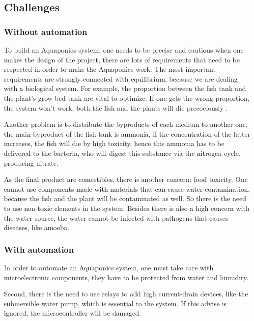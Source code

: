 \subsection{Challenges}

\subsubsection{Without automation}
To build an Aquaponics system,
one needs to be precise and cautious when one makes the design of the project,
there are lots of requirements that need to be respected in order to make the Aquaponics work.
The most important requirements are strongly connected with equilibrium,
because we are dealing with a biological system.
For example,
the proportion between the fish tank and the plant's grow bed tank are vital to optimize.
If one gets the wrong proportion,
the system won't work,
both the fish and the plants will die precociously \cite{Leatherbury2014}.

Another problem is to distribute the byproducts of each medium to another one,
the main byproduct of the fish tank is ammonia,
if the concentration of the latter increases,
the fish will die by high toxicity,
hence this ammonia has to be delivered to the bacteria,
who will digest this substance via the nitrogen cycle,
producing nitrate.

As the final product are comestibles,
there is another concern: food toxicity.
One cannot use components made with materials that can cause water contamination,
because the fish and the plant will be contaminated as well.
So there is the need to use non-toxic elements in the system.
Besides there is also a high concern with the water source,
the water cannot be infected with pathogens that causes diseases,
like amoeba.

\subsubsection{With automation}
In order to automate an Aquaponics system,
one must take care with microelectronic components,
they have to be protected from water and humidity.

Second,
there is the need to use relays to add high current-drain devices,
like the submersible water pump,
which is essential to the system.
If this advise is ignored,
the microcontroller will be damaged.
